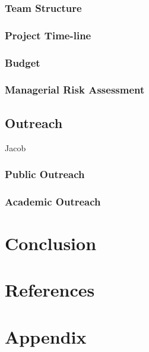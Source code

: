 \documentclass[12pt]{article}
\begin{document}
\subsubsection{Team Structure}
\subsubsection{Project Time-line}
\subsubsection{Budget}
\subsubsection{Managerial Risk Assessment}

\subsection{Outreach}
Jacob
\subsubsection{Public Outreach}
\subsubsection{Academic Outreach}

\section{Conclusion}

\newpage
\section{References}



\section{Appendix}
\end{document}

